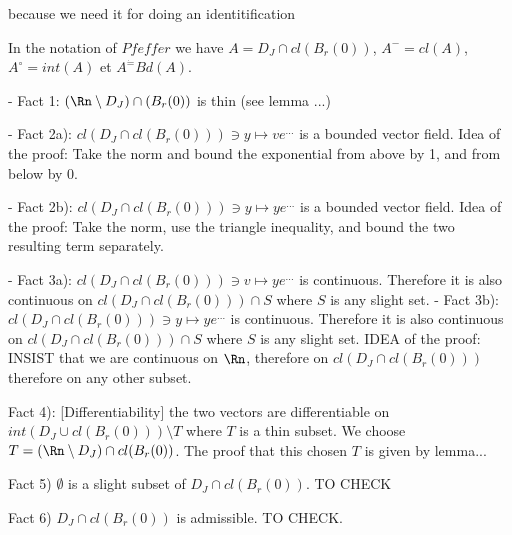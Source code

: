  because we need it for doing an identitification

In the notation of $Pfeffer$ we have
$A = D_J \cap cl (B_r(0))$, $A^- = cl (A)$, 
$A^\circ = int (A)$ et $A^\dot = Bd(A)$. 



- Fact 1: $(\Rn \setminus D_J) \cap (B_r(0))$ is thin (see lemma ...)

- Fact 2a): $cl ( D_J \cap cl(B_r(0))) \ni y \mapsto v e^{...}$  is a bounded vector field.
%
Idea of the proof: Take the norm and bound the exponential from above by 1, and from below by 0.

- Fact 2b): $cl ( D_J \cap cl(B_r(0))) \ni y \mapsto y e^{...}$  is a bounded vector field.
Idea of the proof: Take the norm, use the triangle inequality, and bound the two resulting term separately.

- Fact 3a):  $cl ( D_J \cap cl(B_r(0))) \ni v \mapsto y e^{...}$ is continuous. Therefore it is also continuous on $cl ( D_J \cap cl(B_r(0))) \cap S$ where $S$ is any slight set.
- Fact 3b):  $cl ( D_J \cap cl(B_r(0))) \ni y \mapsto y e^{...}$ is continuous. Therefore it is also continuous on $cl ( D_J \cap cl(B_r(0))) \cap S$ where $S$ is any slight set.
IDEA of the proof: INSIST that we are continuous on $\Rn$, therefore on $cl ( D_J \cap cl(B_r(0)))$ therefore on any other subset.

Fact 4): [Differentiability] the two vectors are differentiable on $int (D_J \cup cl(B_r(0))) \setminus T$ where $T$ is a thin subset. We choose $T = (\Rn \setminus D_J) \cap cl (B_r(0))$. The proof that this chosen  $T$ is  given by lemma...

Fact 5) $\emptyset$ is a slight subset of $D_J \cap cl (B_r(0))$. TO CHECK

Fact 6) $D_J \cap cl (B_r(0))$ is admissible. TO CHECK.

